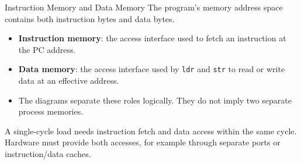 \documentclass[aspectratio=169,11pt,t]{beamer}
\newcommand{\key}[1]{\textbf{#1}}
\newcommand{\code}[1]{\texttt{#1}}
\begin{document}
\begin{frame}{Instruction Memory and Data Memory}
\small
The program's memory address space contains both instruction bytes and data bytes.
\begin{itemize}\setlength{\itemsep}{6pt}
\item \key{Instruction memory}: the access interface used to fetch an instruction at the PC address.
\item \key{Data memory}: the access interface used by \code{ldr} and \code{str} to read or write data at an effective address.
\item The diagrams separate these roles logically. They do not imply two separate process memories.
\end{itemize}
\begin{center}
\end{center}
A single-cycle load needs instruction fetch and data access within the same cycle. Hardware must provide both accesses, for example through separate ports or instruction/data caches.
\end{frame}
\end{document}
